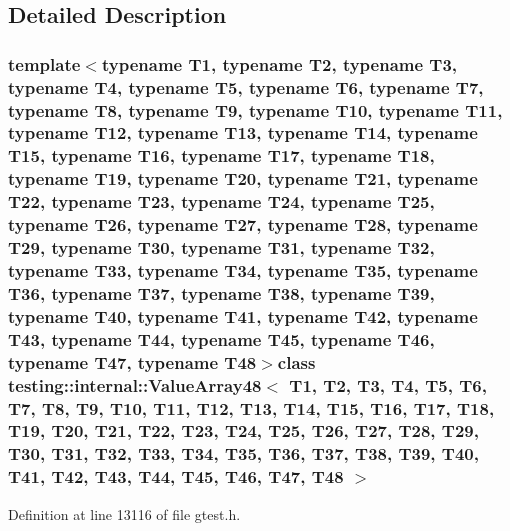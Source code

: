 \subsection{\-Detailed \-Description}
\subsubsection*{template$<$typename T1, typename T2, typename T3, typename T4, typename T5, typename T6, typename T7, typename T8, typename T9, typename T10, typename T11, typename T12, typename T13, typename T14, typename T15, typename T16, typename T17, typename T18, typename T19, typename T20, typename T21, typename T22, typename T23, typename T24, typename T25, typename T26, typename T27, typename T28, typename T29, typename T30, typename T31, typename T32, typename T33, typename T34, typename T35, typename T36, typename T37, typename T38, typename T39, typename T40, typename T41, typename T42, typename T43, typename T44, typename T45, typename T46, typename T47, typename T48$>$class testing\-::internal\-::\-Value\-Array48$<$ T1, T2, T3, T4, T5, T6, T7, T8, T9, T10, T11, T12, T13, T14, T15, T16, T17, T18, T19, T20, T21, T22, T23, T24, T25, T26, T27, T28, T29, T30, T31, T32, T33, T34, T35, T36, T37, T38, T39, T40, T41, T42, T43, T44, T45, T46, T47, T48 $>$}



\-Definition at line 13116 of file gtest.\-h.



